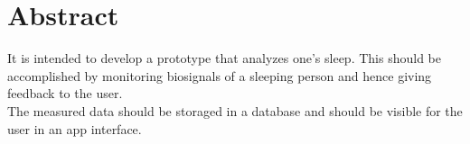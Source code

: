 \thispagestyle{empty}

\section {Abstract} \label {Abstract}

It is intended to develop a prototype that analyzes one's sleep. This should be accomplished by monitoring biosignals of a sleeping person and hence giving feedback to the user. \\
The measured data should be storaged in a database and should be visible for the user in an app interface. 

\thispagestyle{empty}
